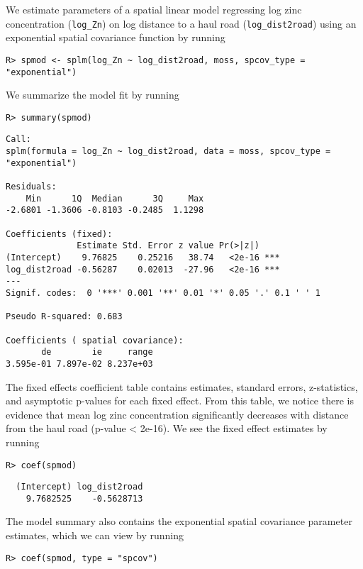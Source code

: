 \documentclass[10pt,letterpaper]{article}
\begin{document}
We estimate parameters of a spatial linear model regressing log zinc
concentration (\texttt{log\_Zn}) on log distance to a haul road
(\texttt{log\_dist2road}) using an exponential spatial covariance
function by running

\begin{verbatim}
R> spmod <- splm(log_Zn ~ log_dist2road, moss, spcov_type = "exponential")
\end{verbatim}

We summarize the model fit by running

\begin{verbatim}
R> summary(spmod)
\end{verbatim}

\begin{verbatim}
Call:
splm(formula = log_Zn ~ log_dist2road, data = moss, spcov_type = "exponential")

Residuals:
    Min      1Q  Median      3Q     Max 
-2.6801 -1.3606 -0.8103 -0.2485  1.1298 

Coefficients (fixed):
              Estimate Std. Error z value Pr(>|z|)    
(Intercept)    9.76825    0.25216   38.74   <2e-16 ***
log_dist2road -0.56287    0.02013  -27.96   <2e-16 ***
---
Signif. codes:  0 '***' 0.001 '**' 0.01 '*' 0.05 '.' 0.1 ' ' 1

Pseudo R-squared: 0.683

Coefficients ( spatial covariance):
       de        ie     range 
3.595e-01 7.897e-02 8.237e+03 
\end{verbatim}

The fixed effects coefficient table contains estimates, standard errors,
z-statistics, and asymptotic p-values for each fixed effect. From this
table, we notice there is evidence that mean log zinc concentration
significantly decreases with distance from the haul road (p-value
\textless{} 2e-16). We see the fixed effect estimates by running

\begin{verbatim}
R> coef(spmod)
\end{verbatim}

\begin{verbatim}
  (Intercept) log_dist2road 
    9.7682525    -0.5628713 
\end{verbatim}

The model summary also contains the exponential spatial covariance
parameter estimates, which we can view by running

\begin{verbatim}
R> coef(spmod, type = "spcov")
\end{verbatim}
\end{document}
